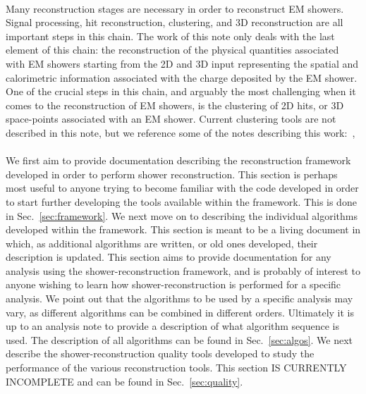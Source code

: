 \paragraph{}Many reconstruction stages are necessary in order to reconstruct EM showers. Signal processing, hit reconstruction, clustering, and 3D reconstruction are all important steps in this chain. The work of this note only deals with the last element of this chain: the reconstruction of the physical quantities associated with EM showers starting from the 2D and 3D input representing the spatial and calorimetric information associated with the charge deposited by the EM shower. One of the crucial steps in this chain, and arguably the most challenging when it comes to the reconstruction of EM showers, is the clustering of 2D hits, or 3D space-points associated with an EM shower. Current clustering tools are not described in this note, but we reference some of the notes describing this work:~\cite{bib:pandora},~\cite{bib:LArOpenCV}
\paragraph{}We first aim to provide documentation describing the reconstruction framework developed in order to perform shower reconstruction. This section is perhaps most useful to anyone trying to become familiar with the code developed in order to start further developing the tools available within the framework. This is done in Sec.~\ref{sec:framework}. We next move on to describing the individual algorithms developed within the framework. This section is meant to be a living document in which, as additional algorithms are written, or old ones developed, their description is updated. This section aims to provide documentation for any analysis using the shower-reconstruction framework, and is probably of interest to anyone wishing to learn how shower-reconstruction is performed for a specific analysis. We point out that the algorithms to be used by a specific analysis may vary, as different algorithms can be combined in different orders. Ultimately it is up to an analysis note to provide a description of what algorithm sequence is used. The description of all algorithms can be found in Sec.~\ref{sec:algos}. We next describe the shower-reconstruction quality tools developed to study the performance of the various reconstruction tools. This section {\color{red} IS CURRENTLY INCOMPLETE} and can be found in Sec.~\ref{sec:quality}.
